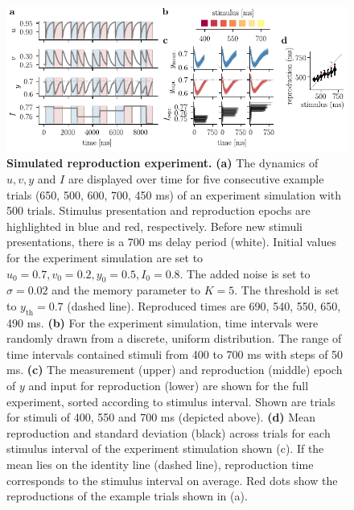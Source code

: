 \documentclass[10pt]{article}
\begin{document}
\begin{figure}[ht]
	\centering
	\includegraphics{figures/trial.pdf}
	\caption{\textbf{Simulated reproduction experiment.} 
	\textbf{(a)} The dynamics of $u, v, y $ and $I$ are displayed over time for five consecutive example trials (650, 500, 600, 700, 450 ms) of an experiment simulation with 500 trials. Stimulus presentation and reproduction epochs are highlighted in blue and red, respectively. Before new stimuli presentations, there is a 700 ms delay period (white). Initial values for the experiment simulation are set to $u_0=0.7, v_0=0.2, y_0=0.5, I_0=0.8$. The added noise is set to $\sigma=0.02$ and the memory parameter to $K=5$. The threshold is set to $y_{\text{th}}=0.7$ (dashed line). Reproduced times are 690, 540, 550, 650, 490 ms.
	\textbf{(b)} For the experiment simulation, time intervals were randomly drawn from a discrete, uniform distribution. The range of time intervals contained stimuli from 400 to 700 ms with steps of 50 ms.
	\textbf{(c)} The measurement (upper) and reproduction (middle) epoch of $y$ and input for reproduction (lower) are shown for the full experiment, sorted according to stimulus interval. Shown are trials for stimuli of 400, 550 and 700 ms (depicted above).
	\textbf{(d)} Mean reproduction and standard deviation (black) across trials for each stimulus interval of the experiment stimulation shown (c). If the mean lies on the identity line (dashed line), reproduction time corresponds to the stimulus interval on average. Red dots show the reproductions of the example trials shown in (a). 
	}
\label{fig:experiment}
\end{figure}
\end{document}
